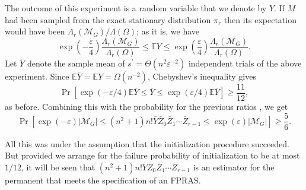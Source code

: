 \begin{flushleft}
	The outcome of this experiment is a random variable that we denote by $Y$. If $M$ had been sampled from the exact stationary distribution $\pi_r$ then its expectation would have been $\Lambda_r\left(\mathcal{M}_G\right) / \Lambda(\Omega)$; as it is, we have
	$$
	\exp \left(-\frac{\varepsilon}{4}\right) \frac{\Lambda_r\left(\mathcal{M}_G\right)}{\Lambda_r(\Omega)} \leq \mathbb{E} Y \leq \exp \left(\frac{\varepsilon}{4}\right) \frac{\Lambda_r\left(\mathcal{M}_G\right)}{\Lambda_r(\Omega)} .
	$$
	Let $\bar{Y}$ denote the sample mean of $s^{\prime}=\Theta\left(n^2 \varepsilon^{-2}\right)$ independent trials of the above experiment. Since $\mathbb{E} \bar{Y}=\mathbb{E} Y=\Omega\left(n^{-2}\right)$, Chebyshev's inequality gives
	$$
	\operatorname{Pr}[\exp (-\varepsilon / 4) \mathbb{E} \bar{Y} \leq \bar{Y} \leq \exp (\varepsilon / 4) \mathbb{E} \bar{Y}] \geq \frac{11}{12},
	$$
	as before. Combining this with the probability for the previous ratios , we get
	$$
	\operatorname{Pr}\left[\exp (-\varepsilon)\left|\mathcal{M}_G\right| \leq\left(n^2+1\right) n!\bar{Y} \bar{Z}_0 \bar{Z}_1 \cdots \bar{Z}_{r-1}\leq \exp (\varepsilon)|\mathcal{M}_G|\right] \geq \frac{5}{6} .
	$$
	
	All this was under the assumption that the initialization procedure succeeded. But provided we arrange for the failure probability of initialization to be at most $1 / 12$, it will be seen that $\left(n^2+1\right) n!\bar{Y} \bar{Z}_0 \bar{Z}_1 \cdots \bar{Z}_{r-1}$ is an estimator for the permanent that meets the specification of an FPRAS.
	
	
\end{flushleft}

